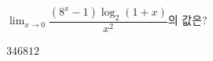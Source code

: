 $\displaystyle\lim_{x\to 0}\dfrac{(8^x-1)\log_2(1+x)}{x^2}$의 값은?
\begin{choices32}{$3$}{$4$}{$6$}{$8$}{$12$}\end{choices32}
